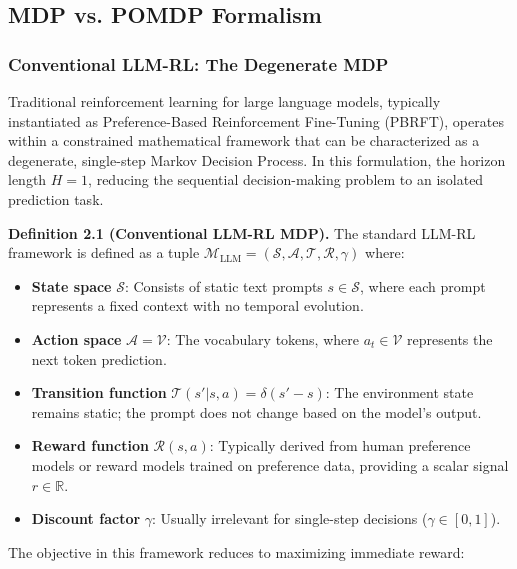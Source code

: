 \subsection{MDP vs. POMDP Formalism}

\subsubsection{Conventional LLM-RL: The Degenerate MDP}

Traditional reinforcement learning for large language models, typically instantiated as Preference-Based Reinforcement Fine-Tuning (PBRFT), operates within a constrained mathematical framework that can be characterized as a degenerate, single-step Markov Decision Process. In this formulation, the horizon length $H = 1$, reducing the sequential decision-making problem to an isolated prediction task.

\textbf{Definition 2.1 (Conventional LLM-RL MDP).} The standard LLM-RL framework is defined as a tuple $\mathcal{M}_{\text{LLM}} = (\mathcal{S}, \mathcal{A}, \mathcal{T}, \mathcal{R}, \gamma)$ where:

\begin{itemize}
    \item \textbf{State space} $\mathcal{S}$: Consists of static text prompts $s \in \mathcal{S}$, where each prompt represents a fixed context with no temporal evolution.

    \item \textbf{Action space} $\mathcal{A} = \mathcal{V}$: The vocabulary tokens, where $a_t \in \mathcal{V}$ represents the next token prediction.

    \item \textbf{Transition function} $\mathcal{T}(s' | s, a) = \delta(s' - s)$: The environment state remains static; the prompt does not change based on the model's output.

    \item \textbf{Reward function} $\mathcal{R}(s, a)$: Typically derived from human preference models or reward models trained on preference data, providing a scalar signal $r \in \mathbb{R}$.

    \item \textbf{Discount factor} $\gamma$: Usually irrelevant for single-step decisions ($\gamma \in [0, 1]$).

\end{itemize}
The objective in this framework reduces to maximizing immediate reward:


